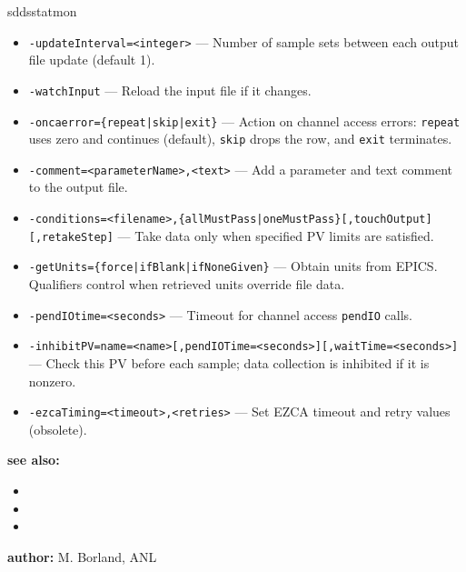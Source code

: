 \begin{sddsprog}{sddsstatmon}
\begin{itemize}
  \item {\tt -updateInterval=<integer>} --- Number of sample sets between each output file update (default 1).
  \item {\tt -watchInput} --- Reload the input file if it changes.
  \item {\tt -oncaerror=\{repeat|skip|exit\}} --- Action on channel access errors: \verb+repeat+ uses zero and continues (default), \verb+skip+ drops the row, and \verb+exit+ terminates.
  \item {\tt -comment=<parameterName>,<text>} --- Add a parameter and text comment to the output file.
  \item {\tt -conditions=<filename>,\{allMustPass|oneMustPass\}[,touchOutput][,retakeStep]} --- Take data only when specified PV limits are satisfied.
  \item {\tt -getUnits=\{force|ifBlank|ifNoneGiven\}} --- Obtain units from EPICS. Qualifiers control when retrieved units override file data.
  \item {\tt -pendIOtime=<seconds>} --- Timeout for channel access \verb+pendIO+ calls.
  \item {\tt -inhibitPV=name=<name>[,pendIOTime=<seconds>][,waitTime=<seconds>]} --- Check this PV before each sample; data collection is inhibited if it is nonzero.
  \item {\tt -ezcaTiming=<timeout>,<retries>} --- Set EZCA timeout and retry values (obsolete).
\end{itemize}

\item \textbf{see also:}
\begin{itemize}
  \item {}
  \item {}
  \item {}
\end{itemize}
\item \textbf{author:} M. Borland, ANL
\end{sddsprog}
